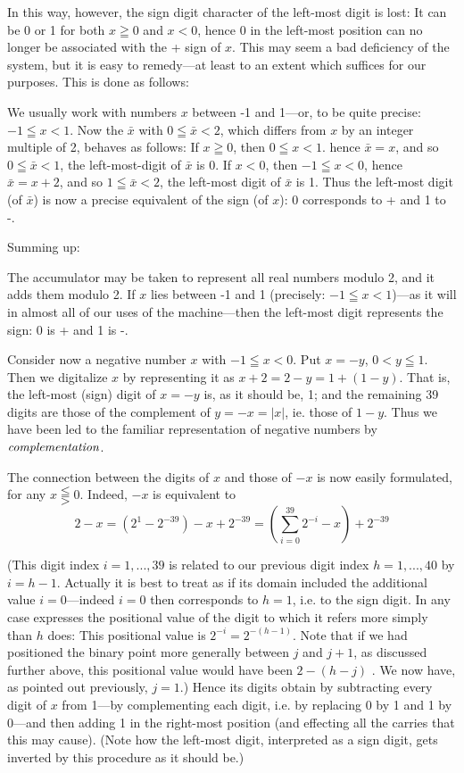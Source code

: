 \documentclass[12pt]{amsart}
\begin{document}
In this way, however, the sign digit character of the left-most digit is lost: It can be 0 or 1 for both $x \geqq 0$ and $x < 0$, hence 0 in the left-most position can no longer be associated with the + sign of $x$. This may seem a bad deficiency of the system, but it is easy to remedy---at least to an extent which suffices for our purposes. This is done as follows:

We usually work with numbers $x$ between -1 and 1---or, to be quite precise: $-1 \leqq x < 1$. Now the $\bar{x}$ with $0 \leqq \bar{x} < 2$, which differs from $x$ by an integer multiple of 2, behaves as follows: If $x \geqq 0$, then $0 \leqq x < 1$. hence $\bar{x} = x$, and so $0 \leqq \bar{x} < 1$, the left-most-digit of $\bar{x}$ is 0. If $x < 0$, then $-1 \leqq x < 0$, hence $\bar{x} = x + 2$, and so $1 \leqq \bar{x} < 2$, the left-most digit of $\bar{x}$ is 1. Thus the left-most digit (of $\bar{x}$) is now a precise equivalent of the sign (of $x$): 0 corresponds to + and 1 to -.

Summing up:

The accumulator may be taken to represent all real numbers modulo 2, and it adds them modulo 2. If $x$ lies between -1 and 1 (precisely: $-1 \leqq x < 1$)---as it will in almost all of our uses of the machine---then the left-most digit represents the sign: 0 is + and 1 is -.

Consider now a negative number $x$ with $-1 \leqq x < 0$. Put $x = -y$, $0 < y \leqq 1$. Then we digitalize $x$ by representing it as $x + 2 = 2 - y = 1 + (1 - y)$. That is, the left-most (sign) digit of $x = - y$ is, as it should be, 1; and the remaining 39 digits are those of the complement of $y = - x = |x|$, ie. those of $1 - y$. Thus we have been led to the familiar representation of negative numbers by $\emph{complementation}$.

The connection between the digits of $x$ and those of $-x$ is now easily formulated, for any $x \lesseqqgtr 0$. Indeed, $-x$ is equivalent to
\[
2 - x = {(2^1 - 2^{-39}) - x} + 2^{-39} = \left(\sum_{i=0}^{39} 2^{-i} - x\right) + 2^{-39}
\]

(This digit index $i = 1, ... , 39$ is related to our previous digit index $h = 1 , ... , 40$ by $i = h - 1$. Actually it is best to treat as if its domain included the additional value $i = 0$---indeed $i = 0$ then corresponds to $h = 1$, i.e. to the sign digit. In any case expresses the positional value of the digit to which it refers more simply than $h$ does: This positional value is $2^{-i} = 2^{-(h-1)}$. Note that if we had positioned the binary point more generally between $j$ and $j + 1$, as discussed further above, this positional value would have been $2 - (h - j)$ . We now have, as pointed out previously, $j = 1$.) Hence its digits obtain by subtracting every digit of $x$ from 1---by complementing each digit, i.e. by replacing 0 by 1 and 1 by 0---and then adding 1 in the right-most position (and effecting all the carries that this may cause). (Note how the left-most digit, interpreted as a sign digit, gets inverted by this procedure as it should be.)
\end{document}

